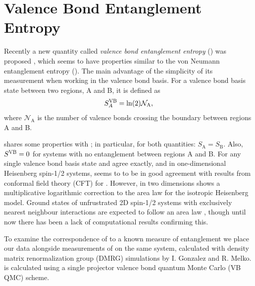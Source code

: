 \chapter{Valence Bond Entanglement Entropy}

Recently a new quantity called {\it{valence bond entanglement entropy}} (\vB) was proposed \cite{Ian1, Alet, Chh},  
which seems to have properties similar to the von Neumann entanglement entropy (\vN).
The main advantage of \vb the simplicity of its measurement when working in the valence bond basis.
For a valence bond basis state \vb between two regions, A and B, it is defined as 
\begin{equation}
S^{\text{VB}}_A = \ln({2})\mathcal{N}_{\text{A}},
\end{equation} 
where $\mathcal{N}_{\text{A}}$ is the number of valence bonds crossing the boundary between
regions A and B.


\vb shares some properties with \vN; in particular, for both quantities: $S_{\text{A}} = S_{\text{B}}$.
Also, $S^{\text{VB}} = 0$ for systems with no entanglement between regions A and B.
For any single valence bond basis state \vb and \vn agree exactly, and
in one-dimensional Heisenberg spin-1/2 systems, \vb seems to to be in good agreement with
results from conformal field theory (CFT) for \vN.
However, in two dimensions \vb shows a multiplicative logarithmic correction to the area law
for the isotropic Heisenberg model.  
Ground states of unfrustrated 2D spin-1/2 systems with exclusively nearest neighbour interactions
are expected to follow an area law \cite{ALreview, DeBeaudrap2010}, though until now there has been a lack of computational results confirming this.


To examine the correspondence of \vb to a known measure of entanglement we place our \vb data alongside measurements of \vn
on the same system, calculated with density matrix renormalization group (DMRG) simulations by I. Gonzalez and R. Melko.
\vb is calculated using a single projector valence bond quantum Monte Carlo (VB QMC) scheme.




